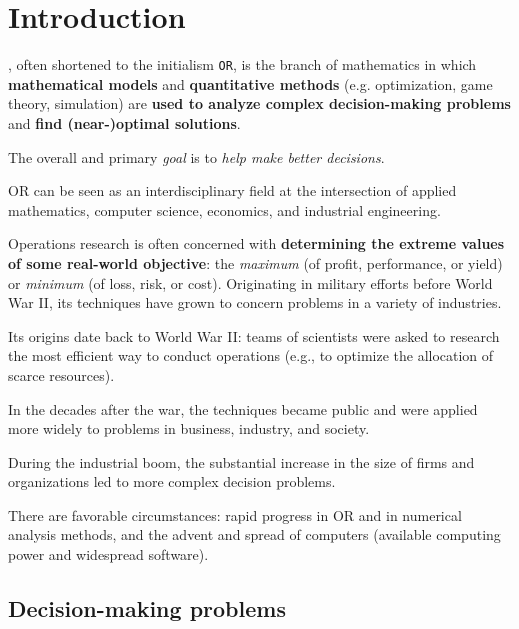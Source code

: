\section{Introduction}

\begin{definitionbox}
    , often shortened to the initialism \texttt{OR}, is the branch of mathematics in which \textbf{mathematical models} and \textbf{quantitative methods} (e.g. optimization, game theory, simulation) are \textbf{used to analyze complex decision-making problems} and \textbf{find (near-)optimal solutions}.
\end{definitionbox}

\highspace
The overall and primary \emph{goal} is to \emph{help make better decisions}.

\highspace
OR can be seen as an interdisciplinary field at the intersection of applied mathematics, computer science, economics, and industrial engineering.

\highspace
Operations research is often concerned with \textbf{determining the extreme values of some real-world objective}: the \emph{maximum} (of profit, performance, or yield) or \emph{minimum} (of loss, risk, or cost). Originating in military efforts before World War II, its techniques have grown to concern problems in a variety of industries.\cite{wikipediaOperationsResearch}

\highspace
Its origins date back to World War II: teams of scientists were asked to research the most efficient way to conduct operations (e.g., to optimize the allocation of scarce resources).

\highspace
In the decades after the war, the techniques became public and were applied more widely to problems in business, industry, and society.

\highspace
During the industrial boom, the substantial increase in the size of firms and organizations led to more complex decision problems.

\highspace
There are favorable circumstances: rapid progress in OR and in numerical analysis methods, and the advent and spread of computers (available computing power and widespread software).

\newpage

\subsection{Decision-making problems}

